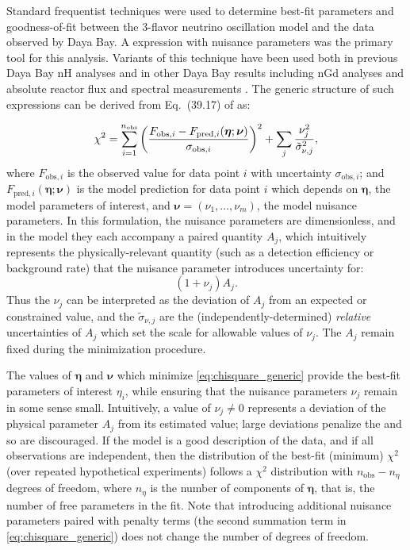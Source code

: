 Standard frequentist techniques were used to determine best-fit parameters
and goodness-of-fit between the 3-flavor neutrino oscillation model
and the data observed by Daya Bay.
A \chisquare{} expression with nuisance parameters
was the primary tool for this analysis.
Variants of this technique have been used both in previous Daya Bay nH analyses
and in other Daya Bay results including nGd \thetaot{} analyses
and absolute reactor \nuebar{} flux and spectral measurements
\cite{nh2016,ngd2016,reactorflux2017,extractionreactorflux2019}.
The generic structure of such \chisquare{} expressions
can be derived from Eq.~(39.17) of \cite{pdg} as:

\begin{equation}
    \label{eq:chisquare_generic}
    \chi^2 = \sum_{i=1}^{n_\text{obs}} \left(
        \frac{F_{\text{obs},i} - F_{\text{pred},i}(\boldsymbol{\eta};\boldsymbol{\nu})}
            {\sigma_{\text{obs},i}}
        \right)^2
        +
        \sum_j \frac{\nu_j^2}{\tilde{\sigma}_{\nu,j}^2},
\end{equation}
where $F_{\text{obs},i}$ is the observed value for data point $i$
with uncertainty $\sigma_{\text{obs},i}$;
and $F_{\text{pred},i}(\boldsymbol{\eta};\boldsymbol{\nu})$
is the model prediction for data point $i$
which depends on $\boldsymbol{\eta}$, the model parameters of interest,
and $\boldsymbol{\nu}=(\nu_1, \ldots, \nu_m)$,
the model nuisance parameters.
In this formulation, the nuisance parameters are dimensionless,
and in the model they each accompany a paired quantity $A_j$,
which intuitively represents the physically-relevant quantity
(such as a detection efficiency or background rate)
that the nuisance parameter introduces uncertainty for:
\begin{equation}
    (1+\nu_j)A_j.
\end{equation}
Thus the $\nu_j$ can be interpreted as the deviation of $A_j$
from an expected or constrained value,
and the $\tilde{\sigma}_{\nu,j}$ are the (independently-determined)
\emph{relative} uncertainties of $A_j$
which set the scale for allowable values of $\nu_j$.
The $A_j$ remain fixed during the minimization procedure.

The values of $\boldsymbol{\eta}$ and $\boldsymbol{\nu}$
which minimize \cref{eq:chisquare_generic}
provide the best-fit parameters of interest $\eta_i$,
while ensuring that the nuisance parameters $\nu_j$
remain in some sense small.
Intuitively, a value of $\nu_j \neq 0$ represents
a deviation of the physical parameter $A_j$ from its estimated value;
large deviations penalize the \chisquare{} and so are discouraged.
If the model is a good description of the data,
and if all observations are independent,
then the distribution of the best-fit (minimum) $\chi^2$
(over repeated hypothetical experiments)
follows a $\chi^2$ distribution with $n_\text{obs} - n_\eta$ degrees of freedom,
where $n_\eta$ is the number of components of $\boldsymbol{\eta}$,
that is, the number of free parameters in the fit.
Note that introducing additional nuisance parameters
paired with penalty terms (the second summation term in \cref{eq:chisquare_generic})
does not change the number of degrees of freedom.

